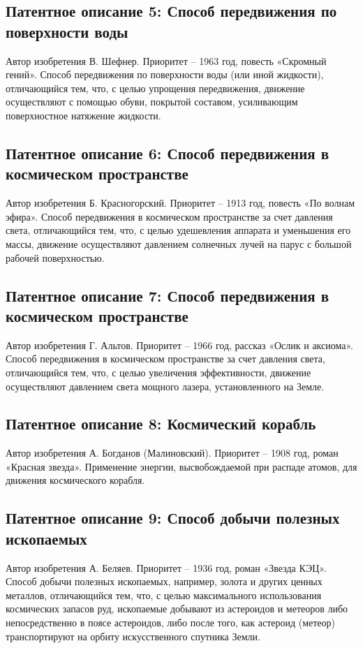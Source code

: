 \documentclass[11pt,a4paper]{article}
\begin{document}
\subsection*{Патентное описание 5: Способ передвижения по поверхности воды}
Автор изобретения В. Шефнер. Приоритет -- 1963 год, повесть «Скромный гений».
Способ передвижения по поверхности воды (или иной жидкости), отличающийся тем,
что, с целью упрощения передвижения, движение осуществляют с помощью обуви,
покрытой составом, усиливающим поверхностное натяжение жидкости.

\subsection*{Патентное описание 6: Способ передвижения в космическом
  пространстве}

Автор изобретения Б. Красногорский. Приоритет -- 1913 год, повесть «По волнам
эфира».  Способ передвижения в космическом пространстве за счет давления
света, отличающийся тем, что, с целью удешевления аппарата и уменьшения его
массы, движение осуществляют давлением солнечных лучей на парус с большой
рабочей поверхностью.

\subsection*{Патентное описание 7: Способ передвижения в космическом
  пространстве}

Автор изобретения Г. Альтов. Приоритет -- 1966 год, рассказ «Ослик и аксиома».
Способ передвижения в космическом пространстве за счет давления света,
отличающийся тем, что, с целью увеличения эффективности, движение осуществляют
давлением света мощного лазера, установленного на Земле.

\subsection*{Патентное описание 8: Космический корабль}
Автор изобретения А. Богданов (Малиновский). Приоритет -- 1908 год, роман
«Красная звезда».  Применение энергии, высвобождаемой при распаде атомов, для
движения космического корабля.

\subsection*{Патентное описание 9: Способ добычи полезных ископаемых}
Автор изобретения А. Беляев. Приоритет -- 1936 год, роман «Звезда КЭЦ».
Способ добычи полезных ископаемых, например, золота и других ценных металлов,
отличающийся тем, что, с целью максимального использования космических запасов
руд, ископаемые добывают из астероидов и метеоров либо непосредственно в поясе
астероидов, либо после того, как астероид (метеор) транспортируют на орбиту
искусственного спутника Земли.
\end{document}
